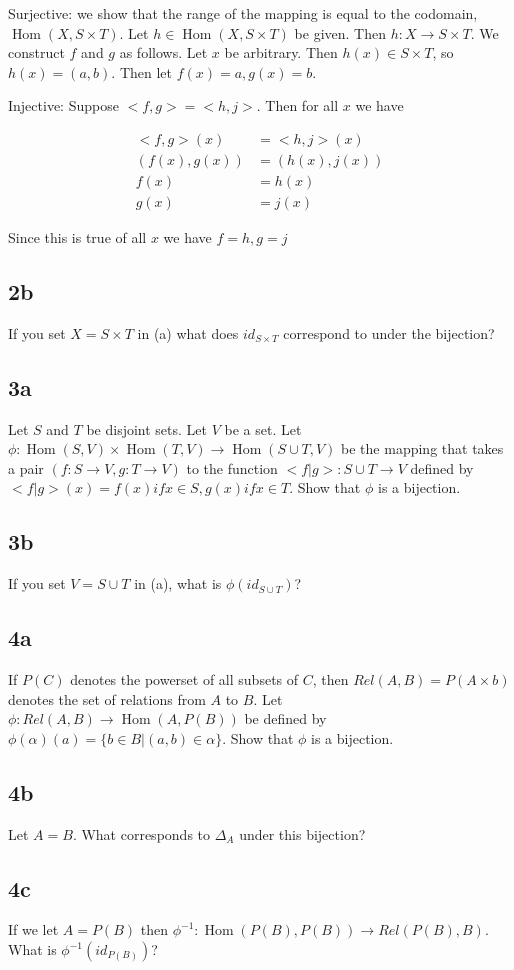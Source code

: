 \documentclass{article}
\DeclareMathOperator{\Hom}{Hom}
\begin{document}
Surjective: we show that the range of the mapping is equal to the codomain, $\Hom(X, S \times T)$. Let $h \in \Hom(X, S \times T)$ be given. Then $h: X \to S \times T$. We construct $f$ and $g$ as follows. Let $x$ be arbitrary. Then $h(x) \in S \times T$, so $h(x) = (a, b)$. Then let $f(x) = a, g(x) = b$.

Injective: Suppose $<f, g> = <h, j>$. Then for all $x$ we have

\begin{align*}
<f, g>(x) &= <h, j>(x) \\
(f(x), g(x)) &= (h(x), j(x)) \\
f(x) &= h(x) \\
g(x) &= j(x)
\end{align*}

Since this is true of all $x$ we have $f = h, g = j$

\subsection*{2b}

If you set $X = S \times T$ in (a) what does $id_{S \times T}$ correspond to under the bijection?

\subsection*{3a}

Let $S$ and $T$ be disjoint sets. Let $V$ be a set. Let $\phi: \Hom(S, V) \times \Hom(T, V) \to \Hom(S \cup T, V)$ be the mapping that takes a pair $(f: S \to V, g: T \to V)$ to the function $<f|g>: S \cup T \to V$ defined by $<f|g>(x) = f(x) if x \in S, g(x) if x \in T$. Show that $\phi$ is a bijection.

\subsection*{3b}

If you set $V = S \cup T$ in (a), what is $\phi(id_{S \cup T})$?

\subsection*{4a}

If $P(C)$ denotes the powerset of all subsets of $C$, then $Rel(A, B) = P(A \times b)$ denotes the set of relations from $A$ to $B$. Let $\phi: Rel(A, B) \to \Hom(A, P(B))$ be defined by $\phi(\alpha)(a) = \{b \in B | (a, b) \in \alpha \}$. Show that $\phi$ is a bijection.

\subsection*{4b}

Let $A = B$. What corresponds to $\Delta_A$ under this bijection?

\subsection*{4c}

If we let $A = P(B)$ then $\phi^{-1}: \Hom(P(B), P(B)) \to Rel(P(B), B)$. What is $\phi^{-1}(id_{P(B)})$?
\end{document}
